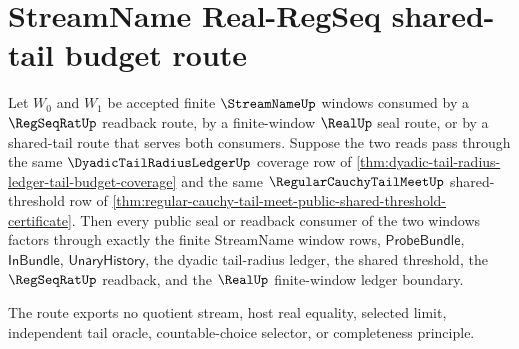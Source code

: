 \section{StreamName Real-RegSeq shared-tail budget route}
\label{sec:streamname-real-regseq-shared-tail-budget-route}

\begin{theorem}
\label{thm:streamname-real-regseq-shared-tail-budget-route}
Let $W_0$ and $W_1$ be accepted finite $\StreamNameUp$ windows consumed by a
$\RegSeqRatUp$ readback route, by a finite-window $\RealUp$ seal route, or by a
shared-tail route that serves both consumers. Suppose the two reads pass
through the same $\DyadicTailRadiusLedgerUp$ coverage row of
\autoref{thm:dyadic-tail-radius-ledger-tail-budget-coverage} and the same
$\RegularCauchyTailMeetUp$ shared-threshold row of
\autoref{thm:regular-cauchy-tail-meet-public-shared-threshold-certificate}.
Then every public seal or readback consumer of the two windows factors through
exactly the finite StreamName window rows, $\mathsf{ProbeBundle}$,
$\mathsf{InBundle}$, $\mathsf{UnaryHistory}$, the dyadic tail-radius ledger,
the shared threshold, the $\RegSeqRatUp$ readback, and the $\RealUp$
finite-window ledger boundary.

The route exports no quotient stream, host real equality, selected limit,
independent tail oracle, countable-choice selector, or completeness principle.
\end{theorem}
